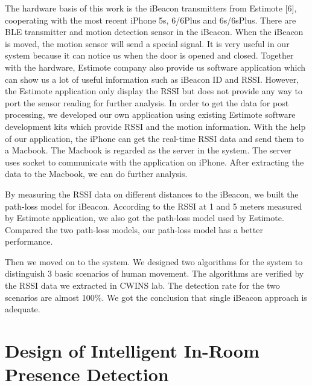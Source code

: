 \documentclass[12pt]{report}
\begin{document}
The hardware basis of this work is the iBeacon transmitters from Estimote [6], cooperating with the most recent iPhone 5s, 6/6Plus and 6s/6sPlus. There are BLE transmitter and motion detection sensor in the iBeacon. When the iBeacon is moved, the motion sensor will send a special signal. It is very useful in our system because it can notice us when the door is opened and closed. Together with the hardware, Estimote company also provide us software application which can show us a lot of useful information such as iBeacon ID and RSSI. However, the Estimote application only display the RSSI but does not provide any way to port the sensor reading for further analysis. In order to get the data for post processing, we developed our own application using existing Estimote software development kits which provide RSSI and the motion information. With the help of our application, the iPhone can get the real-time RSSI data and send them to a Macbook. The Macbook is regarded as the server in the system. The server uses socket to communicate with the application on iPhone. After extracting the data to the Macbook, we can do further analysis.

By measuring the RSSI data on different distances to the iBeacon, we built the path-loss model for iBeacon. According to the RSSI at 1 and 5 meters measured by Estimote application, we also got the path-loss model used by Estimote. Compared the two path-loss models, our path-loss model has a better performance. 

Then we moved on to the system. We designed two algorithms for the system to distinguish 3 basic scenarios of human movement. The algorithms are verified by the RSSI data we extracted in CWINS lab. The detection rate for the two scenarios are almost 100\%. We got the conclusion that single iBeacon approach is adequate.


\fi


\chapter{Design of Intelligent In-Room Presence Detection}
\end{document}
